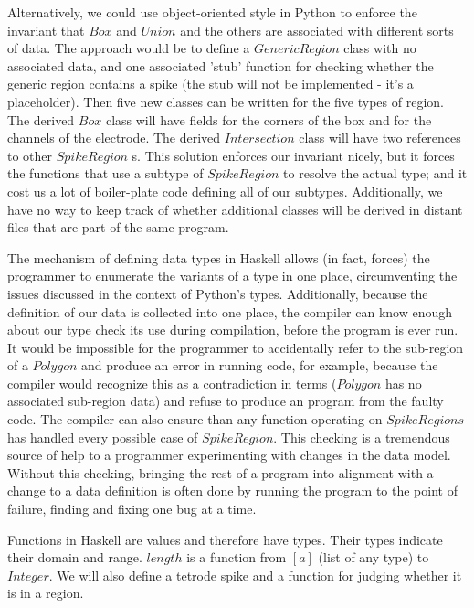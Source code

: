 \documentclass[]{article}
\begin{document}
Alternatively, we could use object-oriented style in Python to enforce
the invariant that \(Box\) and \(Union\) and the others are associated
with different sorts of data. The approach would be to define a
\(GenericRegion\) class with no associated data, and one associated
'stub' function for checking whether the generic region contains a spike
(the stub will not be implemented - it's a placeholder). Then five new
classes can be written for the five types of region. The derived \(Box\)
class will have fields for the corners of the box and for the channels
of the electrode. The derived \(Intersection\) class will have two
references to other \(SpikeRegion\) s. This solution enforces our
invariant nicely, but it forces the functions that use a subtype of
\(SpikeRegion\) to resolve the actual type; and it cost us a lot of
boiler-plate code defining all of our subtypes. Additionally, we have no
way to keep track of whether additional classes will be derived in
distant files that are part of the same program.

The mechanism of defining data types in Haskell allows (in fact, forces)
the programmer to enumerate the variants of a type in one place,
circumventing the issues discussed in the context of Python's types.
Additionally, because the definition of our data is collected into one
place, the compiler can know enough about our type check its use during
compilation, before the program is ever run. It would be impossible for
the programmer to accidentally refer to the sub-region of a \(Polygon\)
and produce an error in running code, for example, because the compiler
would recognize this as a contradiction in terms (\(Polygon\) has no
associated sub-region data) and refuse to produce an program from the
faulty code. The compiler can also ensure than any function operating on
\(SpikeRegions\) has handled every possible case of \(SpikeRegion\).
This checking is a tremendous source of help to a programmer
experimenting with changes in the data model. Without this checking,
bringing the rest of a program into alignment with a change to a data
definition is often done by running the program to the point of failure,
finding and fixing one bug at a time.

Functions in Haskell are values and therefore have types. Their types
indicate their domain and range. \(length\) is a function from \([a]\)
(list of any type) to \(Integer\). We will also define a tetrode spike
and a function for judging whether it is in a region.

\singlespacing
\end{document}
